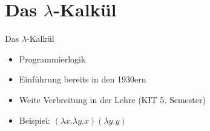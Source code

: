 \section{Das $\lambda$-Kalkül}

\begin{frame}[<+->]{Das $\lambda$-Kalkül}
	\begin{itemize}
		\item Programmierlogik
		\item Einführung bereits in den 1930ern
		\item Weite Verbreitung in der Lehre (KIT 5. Semester)
		\item Beispiel: $(\lambda x.\lambda y.x) (\lambda y.y)$
	\end{itemize}
\end{frame}
